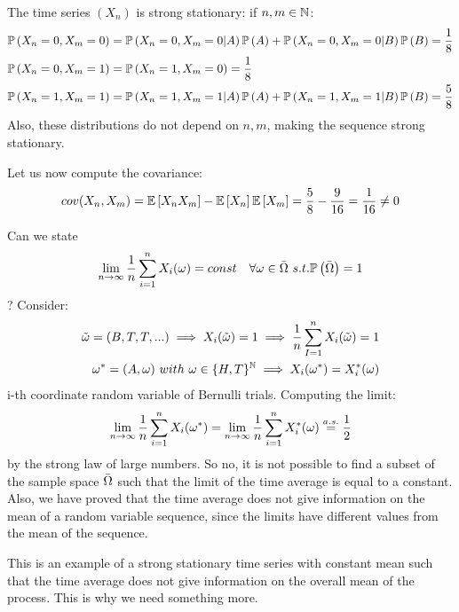 \begin{example}
    The time series $(X_n)$ is strong stationary: if $n,m\in\mathbb{N}$:
    \begin{equation*}
        \begin{split}
            \mathbb{P}\left(X_n=0,X_m=0\right)&=\mathbb{P}\left(X_n=0,X_m=0|A\right)\mathbb{P}\left(A\right)+\mathbb{P}\left(X_n=0,X_m=0|B\right)\mathbb{P}\left(B\right)=\frac{1}{8}\\
            \mathbb{P}\left(X_n=0,X_m=1\right)&=\mathbb{P}\left(X_n=1,X_m=0\right)=\frac{1}{8}\\
            \mathbb{P}\left(X_n=1,X_m=1\right)&=\mathbb{P}\left(X_n=1,X_m=1|A\right)\mathbb{P}\left(A\right)+\mathbb{P}\left(X_n=1,X_m=1|B\right)\mathbb{P}\left(B\right)=\frac{5}{8}\\
        \end{split}
    \end{equation*}
    Also, these distributions do not depend on $n,m$, making the sequence strong stationary.

    Let us now compute the covariance:
    \begin{equation*}
        cov(X_n,X_m)=\mathbb{E}\left[X_nX_m\right]-\mathbb{E}\left[X_n\right]\mathbb{E}\left[X_m\right]=\frac{5}{8}-\frac{9}{16}=\frac{1}{16}\ne 0
    \end{equation*}

    Can we state 
    \[
        \lim_{n\to\infty}\frac{1}{n}\sum_{i=1}^nX_i(\omega)=const\ \ \ \forall \omega\in\mean{\Omega}\ s.t. \prob{\mean{\Omega}}=1  
    \]
    ? Consider:
    \begin{equation*}
        \begin{split}
            \tilde{\omega}=(B,T,T,...) \implies X_i(\tilde{\omega})=1 \implies \frac{1}{n}\sum_{I=1}^nX_i(\tilde{\omega})=1\\
            \omega^*=(A,\omega)\ with\ \omega\in\{H,T\}^{\mathbb{N}} \implies X_i(\omega^*)=X_i^*(\omega)\\
        \end{split}
    \end{equation*}
    i-th coordinate random variable of Bernulli trials. Computing the limit:
    \[
        \lim_{n\to\infty}\frac{1}{n}\sum_{i=1}^nX_i(\omega^*)=\lim_{n\to\infty}\frac{1}{n}\sum_{i=1}^nX_i^*(\omega)\stackrel{a.s.}{=} \frac{1}{2}  
    \]
    by the strong law of large numbers. So no, it is not possible to find a subset of the sample space $\bar{\Omega}$ such that the limit of the time average is equal to a constant. Also, we have proved that the time average does not give information on the mean of a random variable sequence, since the limits have different values from the mean of the sequence.
    
    This is an example of a strong stationary time series with constant mean such that the time average does not give information on the overall mean of the process. This is why we need something more.
\end{example}

